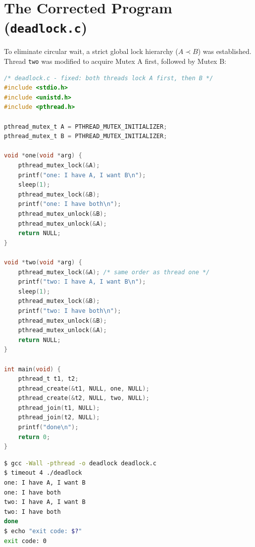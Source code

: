 \documentclass[12pt,a4paper]{report}
\numberwithin{equation}{chapter}
\numberwithin{figure}{chapter}
\numberwithin{table}{chapter}
\begin{document}
\section{The Corrected Program (\texttt{deadlock.c})}
To eliminate circular wait, a strict global lock hierarchy ($A \prec B$) was established. Thread \texttt{two} was modified to acquire Mutex A first, followed by Mutex B:

\begin{lstlisting}[language=C]
/* deadlock.c - fixed: both threads lock A first, then B */
#include <stdio.h>
#include <unistd.h>
#include <pthread.h>

pthread_mutex_t A = PTHREAD_MUTEX_INITIALIZER;
pthread_mutex_t B = PTHREAD_MUTEX_INITIALIZER;

void *one(void *arg) {
    pthread_mutex_lock(&A);
    printf("one: I have A, I want B\n");
    sleep(1);
    pthread_mutex_lock(&B);
    printf("one: I have both\n");
    pthread_mutex_unlock(&B);
    pthread_mutex_unlock(&A);
    return NULL;
}

void *two(void *arg) {
    pthread_mutex_lock(&A); /* same order as thread one */
    printf("two: I have A, I want B\n");
    sleep(1);
    pthread_mutex_lock(&B);
    printf("two: I have both\n");
    pthread_mutex_unlock(&B);
    pthread_mutex_unlock(&A);
    return NULL;
}

int main(void) {
    pthread_t t1, t2;
    pthread_create(&t1, NULL, one, NULL);
    pthread_create(&t2, NULL, two, NULL);
    pthread_join(t1, NULL);
    pthread_join(t2, NULL);
    printf("done\n");
    return 0;
}
\end{lstlisting}

\begin{lstlisting}[language=bash]
$ gcc -Wall -pthread -o deadlock deadlock.c
$ timeout 4 ./deadlock
one: I have A, I want B
one: I have both
two: I have A, I want B
two: I have both
done
$ echo "exit code: $?"
exit code: 0
\end{lstlisting}
\end{document}
